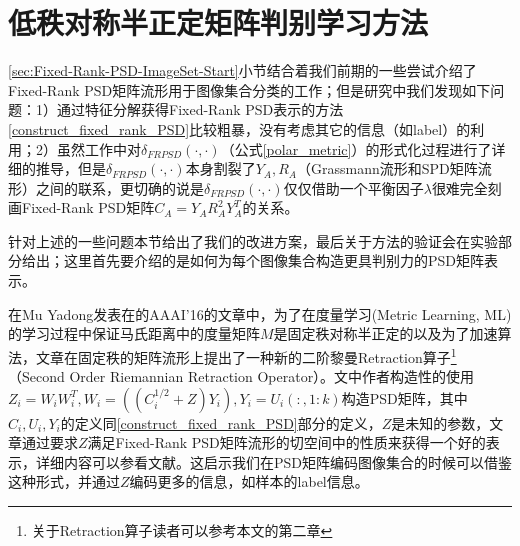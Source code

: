 \section{低秩对称半正定矩阵判别学习方法}
\label{sec:Low-Rank-PSD-Discrim-Approch}
\ref{sec:Fixed-Rank-PSD-ImageSet-Start}小节结合着我们前期的一些尝试介绍了Fixed-Rank PSD矩阵流形用于图像集合分类的工作\cite{PSD_WACV}；但是研究中我们发现如下问题：1）通过特征分解获得Fixed-Rank PSD表示的方法\ref{construct_fixed_rank_PSD}比较粗暴，没有考虑其它的信息（如label）的利用；2）虽然工作\cite{PSD_Riemannian}中对$\delta_{FRPSD}(\cdot,\cdot)$（公式\ref{polar_metric}）的形式化过程进行了详细的推导，但是$\delta_{FRPSD}(\cdot,\cdot)$本身割裂了$Y_A,R_A$（Grassmann流形和SPD矩阵流形）之间的联系，更切确的说是$\delta_{FRPSD}(\cdot,\cdot)$仅仅借助一个平衡因子$\lambda$很难完全刻画Fixed-Rank PSD矩阵$C_A=Y_{A}R_{A}^{2}Y_{A}^{T}$的关系。

针对上述的一些问题本节给出了我们的改进方案，最后关于方法的验证会在实验部分给出；这里首先要介绍的是如何为每个图像集合构造更具判别力的PSD矩阵表示。

在Mu Yadong发表在的AAAI'16的文章\cite{PSD_AAAI}中，为了在度量学习(Metric Learning, ML)的学习过程中保证马氏距离中的度量矩阵$M$是固定秩对称半正定的以及为了加速算法，文章在固定秩的矩阵流形上提出了一种新的二阶黎曼Retraction算子\footnote{关于Retraction算子读者可以参考本文的第二章}（Second Order Riemannian Retraction Operator）。文中作者构造性的使用$Z_{i}=W_iW_{i}^{T},W_{i}=\left((C_{i}^{1/2}+Z) Y_{i}\right),Y_{i}=U_{i}(:,1:k)$构造PSD矩阵，其中$C_{i},U_{i},Y_{i}$的定义同\ref{construct_fixed_rank_PSD}部分的定义，$Z$是未知的参数，文章\cite{PSD_AAAI}通过要求$Z$满足Fixed-Rank PSD矩阵流形的切空间中的性质来获得一个好的表示，详细内容可以参看文献\cite{PSD_AAAI}。这启示我们在PSD矩阵编码图像集合的时候可以借鉴这种形式，并通过$Z$编码更多的信息，如样本的label信息。

